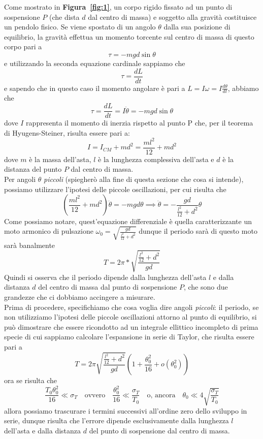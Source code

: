 \documentclass{article}
\begin{document}
\par\smallskip\noindent 	 Come mostrato in \textbf{Figura~\ref{fig:1}}, un corpo rigido fissato ad un punto di sospensione $P$ (che dista $d$ dal centro di massa) e soggetto alla gravità costituisce un pendolo fisico. Se viene spostato di un angolo $\theta$ dalla sua posizione di equilibrio, la gravità effettua un momento torcente sul centro di massa di questo corpo pari a
	$$
		\tau = -mgd\sin{\theta}
	$$
	e utilizzando la seconda equazione cardinale sappiamo che
	\begin{equation*}
		\tau = \frac{dL}{dt}
	\end{equation*}
	e sapendo che in questo caso il momento angolare è pari a $L = I\omega = I \frac{d\theta}{dt}$, abbiamo che
	\begin{equation*}
		\tau = \frac{dL}{dt} = I\ddot{\theta} = -mgd\sin{\theta}
	\end{equation*}
	dove $I$ rappresenta il momento di inerzia rispetto al punto P che, per il teorema di Hyugens-Steiner, risulta essere pari a:
	$$
		I = I_{CM} + md^2 = \frac{ml^2}{12} + md^2
	$$
	dove $m$ è la massa dell'asta, $l$ è la lunghezza complessiva dell'asta e $d$ è la distanza del punto $P$ dal centro di massa. \\
	Per angoli $\theta$ \emph{piccoli} (spiegherò alla fine di questa sezione che cosa si intende), possiamo utilizzare l'ipotesi delle piccole oscillazioni, per cui risulta che
	\begin{equation}
		\left( \frac{ml^2}{12} + md^2 \right) \ddot{\theta} = -mgd\theta \implies \ddot{\theta} = -\frac{gd}{\frac{l^2}{12} + d^2} \theta
	\end{equation}
	Come possiamo notare, quest'equazione differenziale è quella caratterizzante un moto armonico di pulsazione $\omega_0 = \sqrt{\frac{gd}{\frac{l^2}{12} + d^2}}$ dunque il periodo sarà di questo moto sarà banalmente
	\begin{equation}
		T = 2\pi * \sqrt{\frac{ \frac{l^2}{12} + d^2 }{gd}}
	\end{equation}
	Quindi si osserva che il periodo dipende dalla lunghezza dell'asta $l$ e dalla distanza $d$ del centro di massa dal punto di sospensione $P$, che sono due grandezze che ci dobbiamo accingere a misurare. \\
	Prima di procedere, specifichiamo che cosa voglia dire angoli \emph{piccoli}: il periodo, se non utilizziamo l'ipotesi delle piccole oscillazioni attorno al punto di equilibrio, si può dimostrare che essere ricondotto ad un integrale ellittico incompleto di prima specie di cui sappiamo calcolare l'espansione in serie di Taylor, che risulta essere pari a
	\begin{equation}
		T = 2 \pi \sqrt{\frac{\frac{l^2}{12} + d^2}{gd}} \left( 1 + \frac{\theta_0^2}{16} + o(\theta_0^2) \right)
	\end{equation}
	ora se risulta che
	 $$
\frac{T_0\theta^2_0}{16} \ll \sigma_T \quad \text{ovvero} \quad \frac{\theta^2_0}{16} \ll \frac{\sigma_T}{T_0} \quad \text{o, ancora} \quad \theta_0 \ll 4\sqrt{\frac{\sigma_T}{T_0}}
$$
allora possiamo trascurare i termini successivi all'ordine zero dello sviluppo in serie, dunque risulta che l'errore dipende esclusivamente dalla lunghezza $l$ dell'asta e dalla distanza $d$ del punto di sospensione dal centro di massa. 
\end{document}
